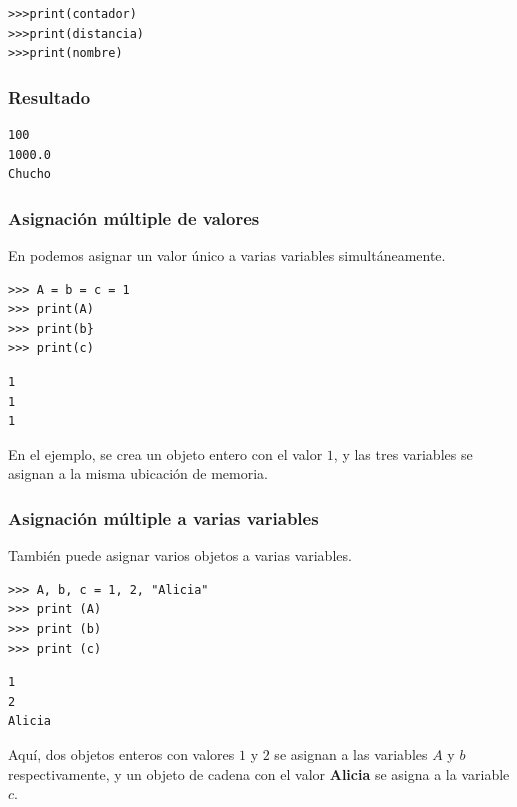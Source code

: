 {\begin{frame}[fragile]
\begin{exampleblock}{}
\begin{verbatim}
>>>print(contador)
>>>print(distancia)
>>>print(nombre)
\end{verbatim}
\end{exampleblock}
\end{frame}
\begin{frame}[fragile]
\frametitle{Resultado}
\begin{verbatim}
100
1000.0
Chucho
\end{verbatim}
\end{frame}
\begin{frame}[fragile]
\frametitle{Asignación múltiple de valores}
En \python podemos asignar un valor único a varias variables simultáneamente.
\\
\bigskip
\begin{minipage}{0.37\textwidth}
\begin{verbatim}
>>> A = b = c = 1
>>> print(A)
>>> print(b}
>>> print(c)
\end{verbatim}
\pause
\begin{verbatim}
1
1
1
\end{verbatim}
\end{minipage}
\hspace{1cm}
\pause
\begin{minipage}{0.47\textwidth}
En el ejemplo, se crea un objeto entero con el valor $1$, y las tres variables se asignan a la misma ubicación de memoria.
\end{minipage}
\end{frame}
\begin{frame}[fragile]
\frametitle{Asignación múltiple a varias variables}
También puede asignar varios objetos a varias variables.
\\
\bigskip
\begin{verbatim}
>>> A, b, c = 1, 2, "Alicia"
>>> print (A)
>>> print (b)
>>> print (c)
\end{verbatim}
\pause
\begin{minipage}{0.3\textwidth}
\begin{verbatim}
1
2
Alicia
\end{verbatim}
\end{minipage}
\pause
\hspace{1.5cm}
\begin{minipage}{0.55\textwidth}
\fontsize{12}{12}\selectfont
Aquí, dos objetos enteros con valores $1$ y $2$ se asignan a las variables $A$ y $b$ respectivamente, y un objeto de cadena con el valor \textbf{Alicia} se asigna a la variable $c$.
\end{minipage}
\end{frame}
}
